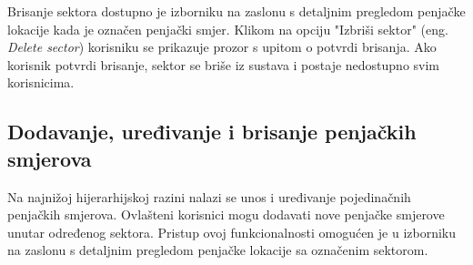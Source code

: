 Brisanje sektora dostupno je izborniku na zaslonu s detaljnim pregledom penjačke lokacije kada je označen penjački smjer. Klikom na opciju "Izbriši sektor" (eng. \textit{Delete sector}) korisniku se prikazuje prozor s upitom o potvrdi brisanja. Ako korisnik potvrdi brisanje, sektor se briše iz sustava i postaje nedostupno svim korisnicima.


\subsection{Dodavanje, uređivanje i brisanje penjačkih smjerova}

Na najnižoj hijerarhijskoj razini nalazi se unos i uređivanje pojedinačnih penjačkih smjerova. Ovlašteni korisnici mogu dodavati nove penjačke smjerove unutar određenog sektora. Pristup ovoj funkcionalnosti omogućen je u izborniku na zaslonu s detaljnim pregledom penjačke lokacije sa označenim sektorom. 

